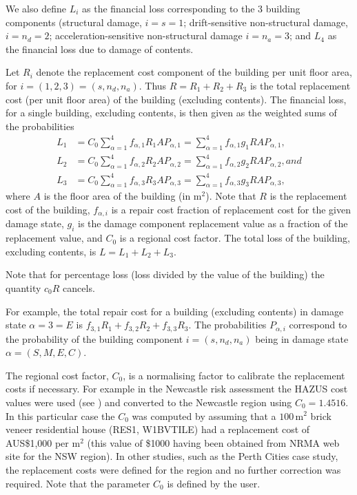 We also define $L_i$ as the financial loss corresponding to the 3
building components (structural damage, $i=s=1$; drift-sensitive
non-structural damage, $i=n_d=2$; acceleration-sensitive
non-structural damage $i=n_a=3$; and $L_4$ as the financial loss
due to damage of contents.


Let $R_i$ denote the replacement cost component of the building
per unit floor area, for $i=(1,2,3)=(s,n_d,n_a)$. Thus
$R=R_1+R_2+R_3$ is the total replacement cost (per unit floor
area) of the building (excluding contents). The financial loss,
for a single building, excluding contents, is then given as the
weighted sums of the probabilities
\begin{align*}
\label{eq:this-loss}
 L_1 &= C_0\sum_{\alpha=1}^4
   f_{\alpha, 1} R_1 A P_{\alpha, 1} =
   \sum_{\alpha=1}^4 f_{\alpha, 1} g_1R A P_{\alpha, 1},\\
L_2 &= C_0 \sum_{\alpha=1}^4
   f_{\alpha, 2} R_2 A P_{\alpha, 2} =
   \sum_{\alpha=1}^4 f_{\alpha, 2} g_2R A P_{\alpha, 2}, and\\
L_3 &= C_0 \sum_{\alpha=1}^4
   f_{\alpha, 3} R_3 A P_{\alpha, 3} =
    \sum_{\alpha=1}^4 f_{\alpha, 3} g_3R A P_{\alpha, 3},
\end{align*}
where $A$ is the floor area of the building (in $\mathrm{m}^2$).
Note that $R$ is the replacement cost of the building, $f_{\alpha,
i}$ is a repair cost fraction of replacement cost for the given
damage state, $g_i$ is the damage component replacement value as a
fraction of the replacement value, and $C_0$ is a regional cost
factor. The total loss of the
building, excluding contents, is $L=L_1+L_2+L_3$.

Note that for percentage loss (loss divided by the value of the
building) the quantity $c_0R$ cancels.


For example, the total repair cost for a building (excluding contents)
in damage
state $\alpha=3=E$ is $f_{3,1}R_1+f_{3,2}R_2+f_{3,3}R_3$.
The probabilities $P_{\alpha, i}$ correspond to the probability
of the building component $i=(s, n_d, n_a)$ being in damage state
$\alpha=(S,M,E,C)$.

The regional cost factor, $C_0$, is a
normalising factor to calibrate the replacement costs if
necessary. For example in the Newcastle risk assessment
\citep{dr_Fulford02a} the HAZUS cost values were used (see
) and converted to the Newcastle region
using $C_0= 1.4516$. In this particular case the $C_0$ was
computed by assuming that a $100\,\mathrm{m^2}$ brick veneer
residential house (RES1, W1BVTILE) had a replacement cost of
AUS\$1,000 per $\mathrm{m}^2$ (this value of \$1000 having been
obtained from NRMA web site for the NSW region). In other studies,
such as the Perth Cities case study, the replacement costs were defined for the region and
no further correction was required. Note that the parameter $C_0$
is defined by the user.

